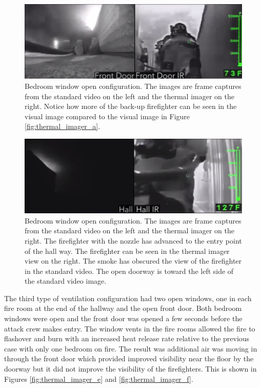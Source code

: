 \documentclass[12pt,oneside]{book}
\begin{document}
\begin{figure}[H]
\centering
\includegraphics[width=1.0\textwidth]{../0_Images/Tactical_Considerations/Thermal_Imager/Exp8FDpair.png}
\caption[Thermal Imager C]{Bedroom window open configuration.  The images are frame captures from the standard video on the left and the thermal imager on the right. Notice how more of the back-up firefighter can be seen in the visual image compared to the visual image in Figure \ref{fig:thermal_imager_a}.}
\label{fig:thermal_imager_c}
\end{figure}

\begin{figure}[H]
\centering
\includegraphics[width=1.0\textwidth]{../0_Images/Tactical_Considerations/Thermal_Imager/Exp8Hallpair.png}
\caption[Thermal Imager D]{Bedroom window open configuration. The images are frame captures from the standard video on the left and the thermal imager on the right. The firefighter with the nozzle has advanced to the entry point of the hall way. The firefighter can be seen in the thermal imager view on the right. The smoke has obscured the view of the firefighter in the standard video. The open doorway is toward the left side of the standard video image.}
\label{fig:thermal_imager_d}
\end{figure}

The third type of ventilation configuration had two open windows, one in each fire room at the end of the hallway and the open front door. Both bedroom windows were open and the front door was opened a few seconds before the attack crew makes entry. The window vents in the fire rooms allowed the fire to flashover and burn with an increased heat release rate relative to the previous case with only one bedroom on fire. The result was additional air was moving in through the front door which provided improved visibility near the floor by the doorway but it did not improve the visibility of the firefighters. This is shown in Figures \ref{fig:thermal_imager_e} and \ref{fig:thermal_imager_f}. 
\end{document}
